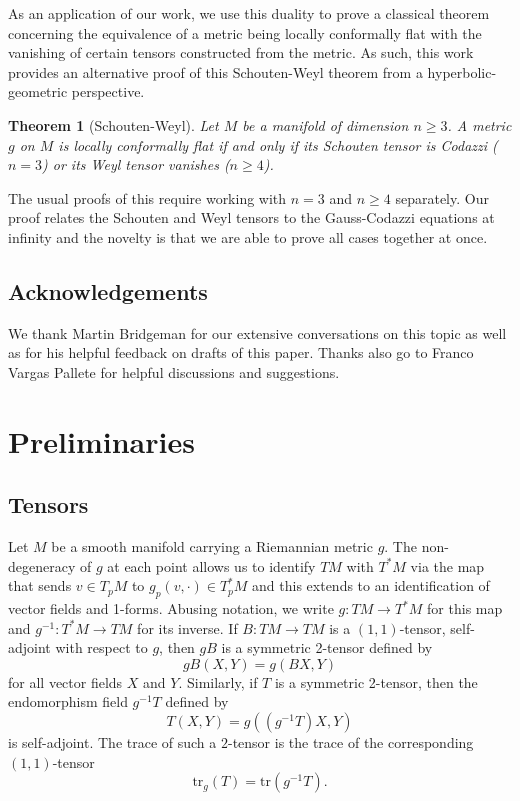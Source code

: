 \documentclass{amsart}
\newcommand{\tr}{\mathrm{tr}}
\newtheorem{bigthm}{Theorem}
\begin{document}
As an application of our work, we use this duality to prove a classical theorem concerning the equivalence of a metric being locally conformally flat with the vanishing of certain tensors constructed from the metric.
As such, this work provides an alternative proof of this Schouten-Weyl theorem from a hyperbolic-geometric perspective.

\begin{bigthm}[Schouten-Weyl]
Let $M$ be a manifold of dimension $n \geq 3$.
A metric $g$ on $M$ is locally conformally flat if and only if its Schouten tensor is Codazzi ($n = 3$) or its Weyl tensor vanishes ($n \geq 4$).
\end{bigthm}
\noindent
The usual proofs of this require working with $n=3$ and $n\geq 4$ separately.
Our proof relates the Schouten and Weyl tensors to the Gauss-Codazzi equations at infinity and the novelty is that we are able to prove all cases together at once. 

\subsection*{Acknowledgements}
We thank Martin Bridgeman for our extensive conversations on this topic as well as for his helpful feedback on drafts of this paper.
Thanks also go to Franco Vargas Pallete for helpful discussions and suggestions. 


\section{Preliminaries}


\subsection{Tensors}

Let $M$ be a smooth manifold carrying a Riemannian metric $g$. 
The non-degeneracy of $g$ at each point allows us to identify $TM$ with $T^*M$ via the map that sends $v \in T_pM$ to $g_p(v,\cdot) \in T^*_pM$ and this extends to an identification of vector fields and 1-forms. 
Abusing notation, we write $g: TM \to T^*M$ for this map and $g^{-1}:T^*M \to TM$ for its inverse.
If $B:TM \to TM$ is a $(1,1)$-tensor, self-adjoint with respect to $g$, then $gB$ is a symmetric 2-tensor defined by
\[
gB(X,Y) = g(BX,Y)
\]
for all vector fields $X$ and $Y$.
Similarly, if $T$ is a symmetric 2-tensor, then the endomorphism field $g^{-1}T$ defined by 
\[
T(X,Y) = g( (g^{-1}T)X,Y)
\]
is self-adjoint.
The trace of such a $2$-tensor is the trace of the corresponding $(1,1)$-tensor
\[
\tr_g(T) = \tr(g^{-1}T).
\]
\end{document}
